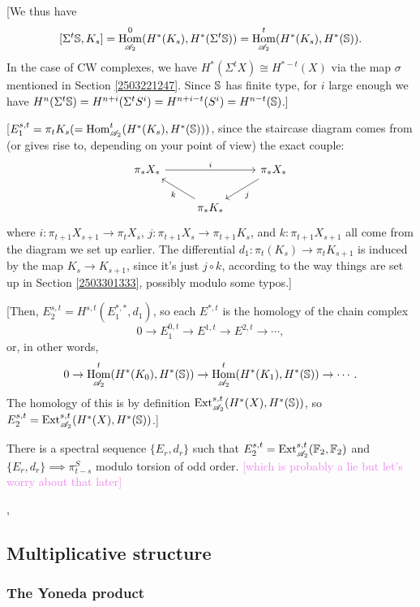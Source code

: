 \documentclass{MetricNotes2023}
\def\bb{\ensuremath\mathbb}
\def\A{\ensuremath{\mathscr{A}_2}}
\DeclareMathOperator{\Ext}{Ext}
\DeclareMathOperator{\Hom}{Hom}
\def\textcolour{\textcolor}
\begin{document}
[We thus have
\[[\Sigma^t \bb{S}, K_s]=\Hom^0_{\A}(H^*(K_s), H^*(\Sigma^t \bb{S}))=\Hom^t_{\A}(H^*(K_s), H^*(\bb{S})).\]
In the case of CW complexes, we have \(H^*(\Sigma^t X)\cong H^{*-t}(X)\) via the map \(\sigma\) mentioned in Section  \ref{2503221247}. Since \(\bb{S}\) has finite type, for \(i\) large enough we have \(H^n(\Sigma^t\bb{S})=H^{n+i}(\Sigma^t S^i)=H^{n+i-t}(S^i)=H^{n-t}(\bb{S})\).]

[\(E_1^{s,t} = \pi_t K_s (=\Hom^t_{\A}(H^*(K_s), H^*(\bb{S})))\), since the staircase diagram comes from (or gives rise to, depending on your point of view) the exact couple:
\[\begin{tikzcd}
 \pi_*X_* \arrow[rr, "i"] & & \pi_* X_* \arrow[dl, "j"] \\ 
 & \pi_*K_* \arrow[ul, "k"] & 
 \end{tikzcd}\]
where \(i : \pi_{t+1}X_{s+1}\to \pi_tX_s\), \(j : \pi_{t+1}X_s \to \pi_{t+1}K_s\), and \(k : \pi_{t+1}X_{s+1}\) all come from the diagram we set up earlier. The differential \(d_1 : \pi_t(K_s)\to\pi_t K_{s+1}\) is induced by the map \(K_s \to K_{s+1}\), since it's just \(j\circ k\), according to the way things are set up in Section \ref{2503301333}, possibly modulo some typos.]

[Then, \(E^{s,t}_2=H^{s,t}(E_1^{*,*}, d_1)\), so each \(E^{*, t}\) is the homology of the chain complex
\[0 \to E^{0,t}_1 \to E^{1,t}\to E^{2,t}\to \cdots,\]
or, in other words,
\[0 \to \Hom^t_{\A}(H^*(K_0), H^*(\bb{S}))\to \Hom^t_{\A}(H^*(K_1), H^*(\bb{S}))\to \cdots.\]
The homology of this is by definition \(\Ext_{\A}^{s,t}(H^*(X), H^*(\bb{S}))\), so \(E_2^{s,t}=\Ext^{s,t}_{\A}(H^*(X), H^*(\bb{S}))\).]

\begin{theorem}\label{2504081125}
There is a spectral sequence \(\{E_r, d_r\}\) such that \(E_2^{s,t}=\Ext_{\A}^{s,t}(\bb{F}_2, \bb{F}_2)\) and \(\{E_r, d_r\}\implies \pi_{t-s}^S\) modulo torsion of odd order. \textcolour{violet}{[which is probably a lie but let's worry about that later]}
\end{theorem}



\autocite{spectral_sequences}, \autocite{hatcher5}

\subsection{Multiplicative structure}

\subsubsection{The Yoneda product}\label{2504171922}
\end{document}
